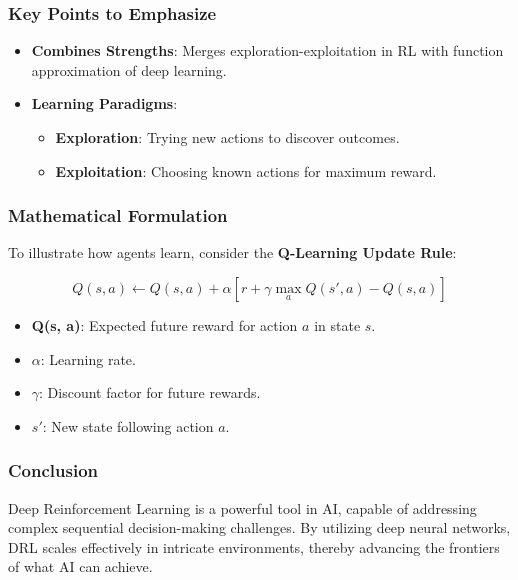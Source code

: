 \documentclass[aspectratio=169]{beamer}
\begin{document}
\begin{frame}[fragile]
    \frametitle{Key Points to Emphasize}
    
    \begin{itemize}
        \item \textbf{Combines Strengths}: Merges exploration-exploitation in RL with function approximation of deep learning.
        \item \textbf{Learning Paradigms}:
        \begin{itemize}
            \item \textbf{Exploration}: Trying new actions to discover outcomes.
            \item \textbf{Exploitation}: Choosing known actions for maximum reward.
        \end{itemize}
    \end{itemize}
    
\end{frame}

\begin{frame}[fragile]
    \frametitle{Mathematical Formulation}
    
    To illustrate how agents learn, consider the \textbf{Q-Learning Update Rule}:
    
    \begin{equation}
    Q(s, a) \leftarrow Q(s, a) + \alpha \left[ r + \gamma \max_a Q(s', a) - Q(s, a) \right]
    \end{equation}
    
    \begin{itemize}
        \item \textbf{Q(s, a)}: Expected future reward for action \(a\) in state \(s\).
        \item \(\alpha\): Learning rate.
        \item \(\gamma\): Discount factor for future rewards.
        \item \(s'\): New state following action \(a\).
    \end{itemize}
    
\end{frame}

\begin{frame}[fragile]
    \frametitle{Conclusion}
    
    Deep Reinforcement Learning is a powerful tool in AI, capable of addressing complex sequential decision-making challenges. By utilizing deep neural networks, DRL scales effectively in intricate environments, thereby advancing the frontiers of what AI can achieve.
    
\end{frame}
\end{document}
